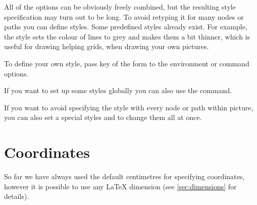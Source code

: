 All of the options can be obviously freely combined, but the resulting style
specification may turn out to be long. To avoid retyping it for many nodes or
paths you can define styles. Some predefined styles already exist. For example,
the  style sets the colour of lines to grey and makes them a
bit thinner, which is useful for drawing helping grids, when drawing your own
pictures.
\begin{example}
\end{example}
To define your own style, pass key of the form
 to the \TikZ{} environment or
command options.
\begin{example}[vertical_mode, examplewidth=0.7\linewidth]
\end{example}
If you want to set up some styles globally you can also use the 
command.
\begin{example}
\end{example}
If you want to avoid specifying the style with every node or path within
\TikZ{} picture, you can also set a special styles  and
 to change them all at once.
\begin{example}
\end{example}

\section{Coordinates}

So far we have always used the default centimetres for specifying coordinates,
however it is possible to use any \LaTeX{} dimension (see
\autoref{sec:dimensions} for details).
\begin{example}
\end{example}

